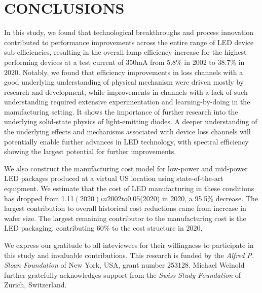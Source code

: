 \documentclass[a4paper,nocompress]{spie}  %
\begin{document}
\section{CONCLUSIONS}

    In this study, we found that technological breakthroughs and process innovation contributed to performance improvements across the entire range of LED device sub-efficiencies, resulting in the overall lamp efficiency increase for the highest performing devices at a test current of 350mA from 5.8\% in 2002 to 38.7\% in 2020. Notably, we found that efficiency improvements in loss channels with a good underlying understanding of physical mechanism were driven mostly by research and development, while improvements in channels with a lack of such understanding required extensive experimentation and learning-by-doing in the manufacturing setting. It shows the importance of further research into the underlying solid-state physics of light-emitting diodes. A deeper understanding of the underlying effects and mechanisms associated with device loss channels will potentially enable further advances in LED technology, with spectral efficiency showing the largest potential for further improvements. 

    We also construct the manufacturing cost model for low-power and mid-power LED packages produced at a virtual US location using state-of-the-art equipment. We estimate that the cost of LED manufacturing in these conditions has dropped from 1.11$(2020) in 2002 to 0.05$(2020) in 2020, a 95.5\% decrease. The largest contribution to overall historical cost reductions came from increase in wafer size. The largest remaining contributor to the manufacturing cost is the LED packaging, contributing 60\% to the cost structure in 2020.

\acknowledgments %

We express our gratitude to all inteviewees for their willingness to participate in this study and invaluable contributions. This research is funded by the \textit{Alfred P. Sloan Foundation} of New York, USA, grant number 253128. Michael Weinold further gratefully acknowledges support from the \textit{Swiss Study Foundation} of Zurich, Switzerland.

\clearpage
\end{document}
